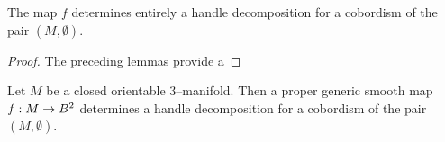 \begin{lem}
	


\end{lem}

\begin{theorem}
	\label{lem:3body4handle}
	\label{thm:3bound4}
	The map $f$ determines entirely a handle decomposition for a cobordism of the pair $(M,\emptyset)$.
\end{theorem}

\begin{proof}
	The preceding lemmas provide a
	
\end{proof}

\begin{theorem}

	Let $M$ be a closed orientable 3--manifold.
	Then a proper generic smooth map $f:M\to B^2$ determines a handle decomposition for a cobordism of the pair $(M,\emptyset)$.
\end{theorem}

